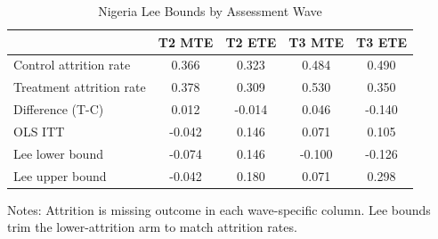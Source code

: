 \begin{table}[!htbp]
\centering
\caption{Nigeria Lee Bounds by Assessment Wave}
\label{tab:ng_lee_bounds}
\begin{threeparttable}
\begin{tabular}[t]{lcccc}
\toprule
 & T2 MTE & T2 ETE & T3 MTE & T3 ETE \\
\midrule
Control attrition rate & 0.366 & 0.323 & 0.484 & 0.490 \\
Treatment attrition rate & 0.378 & 0.309 & 0.530 & 0.350 \\
Difference (T-C) & 0.012 & -0.014 & 0.046 & -0.140 \\
\addlinespace
OLS ITT &  -0.042 &   0.146 &   0.071 &   0.105 \\
Lee lower bound &  -0.074 &   0.146 &  -0.100 &  -0.126 \\
Lee upper bound &  -0.042 &   0.180 &   0.071 &   0.298 \\
\bottomrule
\end{tabular}
\begin{tablenotes}[para]
\item Notes: Attrition is missing outcome in each wave-specific column. Lee bounds trim the lower-attrition arm to match attrition rates.
\end{tablenotes}
\end{threeparttable}
\end{table}
